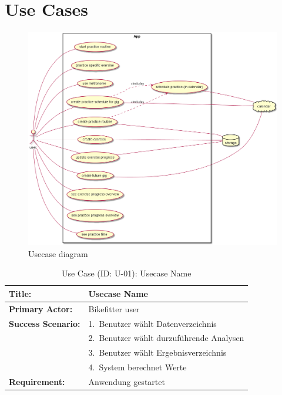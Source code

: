 \documentclass[12pt,a4paper]{report}
\begin{document}
\section{Use Cases}
\begin{figure}[htp]
\includegraphics[width=12cm]{usecases1.png}
\caption{Usecase diagram}
\end{figure}

\begin{table}[htp]
\caption{Use Case (ID: U-01): Usecase Name}\label{U-01}
\begin{tabular}{lp{10cm}}
  \hline
  \textbf{Title:}             & Usecase Name \\
  \hline
  \textbf{Primary Actor:}     & Bikefitter \/ user \\
  \hline
  \textbf{Success Scenario:}  & 1.~Benutzer wählt Datenverzeichnis \\
                              & 2.~Benutzer wählt durzuführende Analysen \\
                              & 3.~Benutzer wählt Ergebnisverzeichnis \\
                              & 4.~System berechnet Werte \\
  \hline
  \textbf{Requirement:}       & Anwendung gestartet \\
  \hline
\end{tabular}
\end{table}

\begin{appendix}
  \listoftables
\end{appendix}
\end{document}

